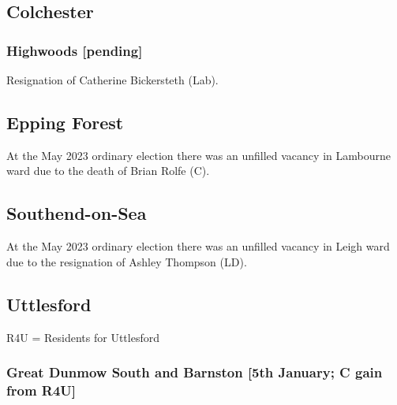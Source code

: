 \documentclass[a4paper,openany]{book}
\begin{document}
\begin{resultsiii}
\subsection*{Colchester}

\subsubsection*{Highwoods \hspace*{\fill}\nolinebreak[1]%
	\enspace\hspace*{\fill}
	[pending]}


Resignation of Catherine Bickersteth (Lab).

\subsection*{Epping Forest}

At the May 2023 ordinary election there was an unfilled vacancy in Lambourne ward due to the death of Brian Rolfe (C).%

\subsection*{Southend-on-Sea}

At the May 2023 ordinary election there was an unfilled vacancy in Leigh ward due to the resignation of Ashley Thompson (LD).%

\subsection*{Uttlesford}

R4U = Residents for Uttlesford

\subsubsection*{Great Dunmow South and Barnston \hspace*{\fill}\nolinebreak[1]%
	\enspace\hspace*{\fill}
	[5th January; C gain from R4U]}



\end{resultsiii}
\end{document}
